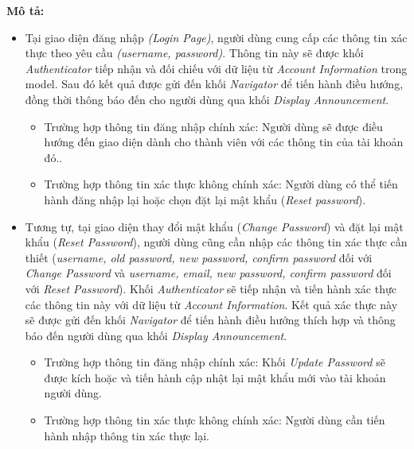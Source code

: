         \newpage
	\textbf{Mô tả:}
        \begin{itemize}
            \item Tại giao diện đăng nhập \textit{(Login Page)}, người dùng cung cấp các thông tin xác thực theo yêu cầu \textit{(username, password)}. Thông tin này sẽ được khối \textit{Authenticator} tiếp nhận và đối chiếu với dữ liệu từ \textit{Account Information} trong model. Sau đó kết quả được gửi đến khối \textit{Navigator} để tiến hành điều hướng, đồng thời thông báo đến cho người dùng qua khối \textit{Display Announcement}.
            \begin{itemize}
                \item Trường hợp thông tin đăng nhập chính xác: Người dùng sẽ được điều hướng đến giao
                diện dành cho thành viên với các thông tin của tài khoản đó..
                \item Trường hợp thông tin xác thực không chính xác: Người dùng có thể tiến hành đăng nhập lại hoặc chọn đặt lại mật khẩu (\textit{Reset password}).    
            \end{itemize}
            \item Tương tự, tại giao diện thay đổi mật khẩu (\textit{Change Password}) và đặt lại mật khẩu (\textit{Reset Password}), người dùng cũng cần nhập các thông tin xác thực cần thiết (\textit{username, old password, new password, confirm password} đối với \textit{Change Password} và \textit{username, email, new password, confirm password} đối với \textit{Reset Password}). Khối \textit{Authenticator} sẽ tiếp nhận và tiến hành xác thực các thông tin này với dữ liệu từ \textit{Account Information}. Kết quả xác thực này sẽ được gửi đến khối \textit{Navigator} để tiến hành điều hướng thích hợp và thông báo đến người dùng qua khối \textit{Display Announcement}.
            \begin{itemize}
                \item Trường hợp thông tin đăng nhập chính xác: Khối \textit{Update Password} sẽ được kích hoặc và tiến hành cập nhật lại mật khẩu mới vào tài khoản người dùng.
                \item Trường hợp thông tin xác thực không chính xác: Người dùng cần tiến hành nhập thông tin xác thực lại.
            \end{itemize}
        \end{itemize}